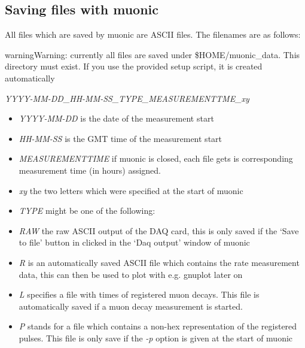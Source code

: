 \documentclass[letterpaper,10pt,english]{sphinxmanual}
\begin{document}

\begin{fulllineitems}
\label{tutorial:cmdoption-muonic-n}
\end{fulllineitems}



\subsection{Saving files with muonic}
\label{tutorial:saving-files-with-muonic}
All files which are saved by muonic are ASCII files. The filenames are as follows:

\begin{notice}{warning}{Warning:}
currently all files are saved under \$HOME/muonic\_data. This directory must exist. If you use the provided setup script, it is created automatically
\end{notice}

\emph{YYYY-MM-DD\_HH-MM-SS\_TYPE\_MEASUREMENTTME\_xy}
\begin{itemize}
\item {} 
\emph{YYYY-MM-DD} is the date of the measurement start

\item {} 
\emph{HH-MM-SS} is the GMT time of the measurement start

\item {} 
\emph{MEASUREMENTTIME} if muonic is closed, each file gets is corresponding measurement time (in hours) assigned.

\item {} 
\emph{xy} the two letters which were specified at the start of muonic

\item {} 
\emph{TYPE} might be one of the following:

\end{itemize}
\begin{itemize}
\item {} 
\emph{RAW} the raw ASCII output of the DAQ card, this is only saved if the `Save to file' button in clicked in the `Daq output' window of muonic

\item {} 
\emph{R} is an automatically saved ASCII file which contains the rate measurement data, this can then be used to plot with e.g. gnuplot later on

\item {} 
\emph{L} specifies a file with times of registered muon decays. This file is automatically saved if a muon decay measurement is started.

\item {} 
\emph{P} stands for a file which contains a non-hex representation of the registered pulses. This file is only save if the \emph{-p} option is given at the start of muonic

\end{itemize}
\end{document}
